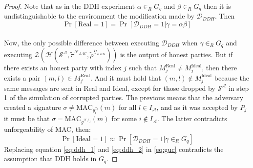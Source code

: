\documentclass{acm_proc_article-sp}
\begin{document}
\begin{proof}
Note that as in the DDH experiment $\alpha \in_{R} G_q$ and $\beta \in_{R} G_q$ then it is undistinguishable to the
environment the modification made by $\mathcal{D}_{DDH}$. Then
\begin{equation}
\Pr[\mathrm{Real} = 1] = \Pr[\mathcal{D}_{DDH} = 1|\gamma = \alpha\beta]
\label{eq:ddh_1}
\end{equation}\\
Now, the only possible difference between executing $\mathcal{D}_{DDH}$ when $\gamma \in_R G_q$ and executing
$
\mathcal{Z}(
    \mathcal{H}(
        \mathcal{S^A},
        \tilde{\pi}^{\mathcal{F}_{AAC}},
        \tilde{\rho}^{\bar{\mathcal{G}}_{KRK}}))
$
is the output of honest parties. But if there exists an honest party with index $j$ such that $M_j^\mathrm{Real} \neq M_j^\mathrm{Ideal}$,
then there exists a pair $(m, l) \in M_j^\mathrm{Real}$. And it must hold that $(m, l) \notin M_j^\mathrm{Ideal}$ because the
same messages are sent in Real and Ideal, except for those dropped by $\mathcal{S^A}$ in step 1 of the simulation of corrupted
parties. The previous means that the adversary created a signature $\sigma \neq \mathrm{MAC}_{y_i^{x_l}}(m)$ for all $l \in I_\mathcal{A}$,
and as it was accepted by $P_j$ it must be that $\sigma = \mathrm{MAC}_{g^{\gamma r_i r_j}}(m)$ for some $i \notin I_\mathcal{A}$.
The latter contradicts unforgeability of MAC, then:
\begin{equation}
\Pr[\mathrm{Ideal} = 1] \approx \Pr[\mathcal{D}_{DDH} = 1|\gamma \in_R G_q]
\label{eq:ddh_2}
\end{equation}
Replacing equation \ref{eq:ddh_1} and \ref{eq:ddh_2} in \ref{eq:guc} contradicts the assumption that DDH holds in $G_q$.
\end{proof}

%

%
%
\end{document}
